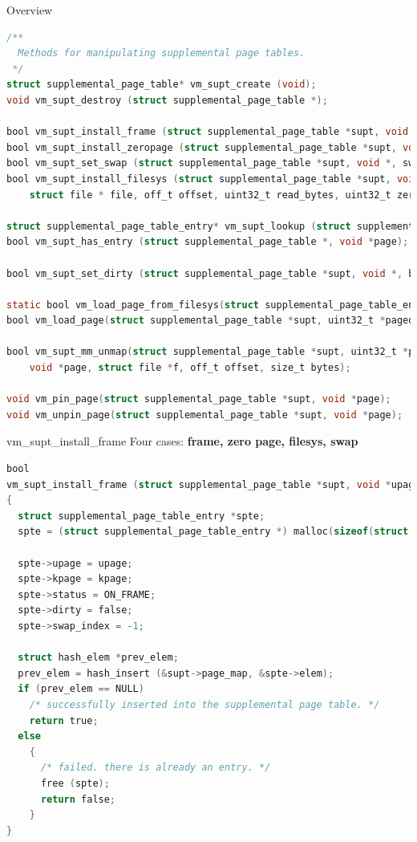 \documentclass[10pt]{beamer}
\begin{document}
\begin{frame}[fragile]{Overview}
\begin{lstlisting}[language=C]
/**
  Methods for manipulating supplemental page tables.
 */
struct supplemental_page_table* vm_supt_create (void);
void vm_supt_destroy (struct supplemental_page_table *);

bool vm_supt_install_frame (struct supplemental_page_table *supt, void *upage, void *kpage);
bool vm_supt_install_zeropage (struct supplemental_page_table *supt, void *);
bool vm_supt_set_swap (struct supplemental_page_table *supt, void *, swap_index_t);
bool vm_supt_install_filesys (struct supplemental_page_table *supt, void *page,
    struct file * file, off_t offset, uint32_t read_bytes, uint32_t zero_bytes, bool writable);

struct supplemental_page_table_entry* vm_supt_lookup (struct supplemental_page_table *supt, void *);
bool vm_supt_has_entry (struct supplemental_page_table *, void *page);

bool vm_supt_set_dirty (struct supplemental_page_table *supt, void *, bool);

static bool vm_load_page_from_filesys(struct supplemental_page_table_entry *, void *);
bool vm_load_page(struct supplemental_page_table *supt, uint32_t *pagedir, void *upage);

bool vm_supt_mm_unmap(struct supplemental_page_table *supt, uint32_t *pagedir,
    void *page, struct file *f, off_t offset, size_t bytes);

void vm_pin_page(struct supplemental_page_table *supt, void *page);
void vm_unpin_page(struct supplemental_page_table *supt, void *page);
\end{lstlisting}
\end{frame}
\begin{frame}[fragile]{vm\_supt\_install\_frame}
Four cases: \textbf{frame, zero page, filesys, swap}
\begin{lstlisting}[language=C]
bool
vm_supt_install_frame (struct supplemental_page_table *supt, void *upage, void *kpage)
{
  struct supplemental_page_table_entry *spte;
  spte = (struct supplemental_page_table_entry *) malloc(sizeof(struct supplemental_page_table_entry));

  spte->upage = upage;
  spte->kpage = kpage;
  spte->status = ON_FRAME;
  spte->dirty = false;
  spte->swap_index = -1;

  struct hash_elem *prev_elem;
  prev_elem = hash_insert (&supt->page_map, &spte->elem);
  if (prev_elem == NULL) 
    /* successfully inserted into the supplemental page table. */
    return true;
  else 
    {
      /* failed. there is already an entry. */
      free (spte);
      return false;
    }
}
\end{lstlisting}
\end{frame}
\end{document}
